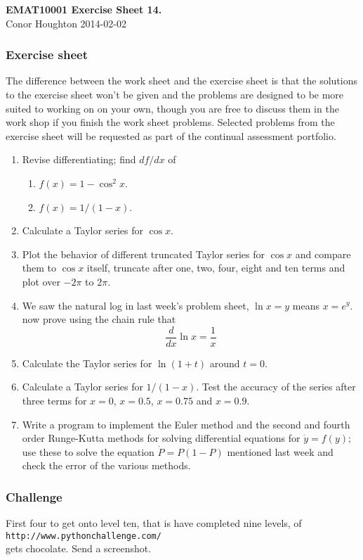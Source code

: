 \documentclass[12pt]{article}
\begin{document}
\begin{center}
{\bf EMAT10001 Exercise Sheet 14.}\\[1cm]{} Conor Houghton 2014-02-02
\end{center}

\subsubsection*{Exercise sheet}

The difference between the work sheet and the exercise sheet is that
the solutions to the exercise sheet won't be given and the problems
are designed to be more suited to working on on your own, though you
are free to discuss them in the work shop if you finish the work sheet
problems. Selected problems from the exercise sheet will be requested
as part of the continual assessment portfolio.

\begin{enumerate}

\item Revise differentiating; find $df/dx$ of
\begin{enumerate}
\item $f(x)=1-\cos^2{x}$.
\item $f(x)=1/(1-x)$.
\end{enumerate}

\item Calculate a Taylor series for $\cos{x}$. 

\item Plot the behavior of different truncated Taylor series for
  $\cos{x}$ and compare them to $\cos{x}$ itself, truncate after one,
  two, four, eight and ten terms and plot over $-2\pi$ to $2\pi$.

\item We saw the natural log in last week's problem sheet, $\ln{x}=y$
  means $x=e^y$. now prove using the chain rule that
\begin{equation}
\frac{d}{dx}\ln{x}=\frac{1}{x}
\end{equation}

\item Calculate the Taylor series for $\ln{(1+t)}$ around $t=0$.

\item Calculate a Taylor series for $1/(1-x)$. Test the accuracy of the
  series after three terms for $x=0$, $x=0.5$, $x=0.75$ and $x=0.9$.

\item Write a program to implement the Euler method and the second and
  fourth order Runge-Kutta methods for solving differential equations
  for $\dot{y}=f(y)$; use these to solve the equation $\dot{P}=P(1-P)$
  mentioned last week and check the error of the various methods.

\end{enumerate}

\subsubsection*{Challenge}
First four to get onto level ten, that is have completed nine levels, of\\ 
\texttt{http://www.pythonchallenge.com/}\\ gets chocolate. Send a screenshot.
\end{document}
